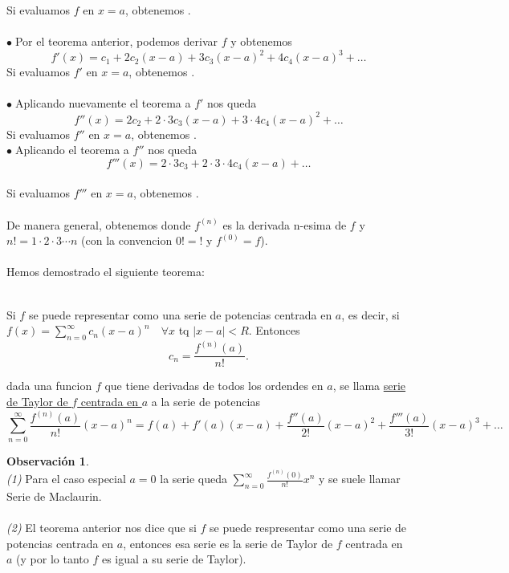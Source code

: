 \documentclass{article}
\theoremstyle{definition}
\newtheorem*{obs}{Observación}
\theoremstyle{remark}
\newcommand\bl{$\bullet\;$}
\begin{document}
 Si evaluamos $f$ en $x=a$, obtenemos .
\\\\
\bl Por el teorema anterior, podemos derivar $f$ y obtenemos \[
f'(x)=c_1+2c_2(x-a)+3c_3(x-a)^2+4c_4(x-a)^3+\dots
\]
 Si evaluamos $f'$ en $x=a$, obtenemos .
\\\\
\bl Aplicando nuevamente el teorema a $f'$ nos queda 
\[ 
f''(x)=2c_2+2\cdot 3 c_3 (x-a)+3\cdot 4 c_4(x-a)^2+\dots
\]
 Si evaluamos $f''$ en $x=a$, obtenemos . \\  

\bl Aplicando el teorema a $f''$ nos queda \[ 
f'''(x)=2\cdot 3 c_3+2\cdot3\cdot4 c_4(x-a)+\dots
\] \\
 Si evaluamos $f'''$ en $x=a$, obtenemos .
\\\\
De manera general, obtenemos  donde $f^{(n)}$ es la derivada n-esima  de $f$ y $n!=1\cdot2\cdot3\cdots n$ \big(con la convencion $0!=!$ y $f^{(0)}=f$\big).
\\\\
Hemos demostrado el siguiente teorema:
\begin{teo} \; \\
Si $f$ se puede representar como una serie de potencias centrada en $a$, es decir, si $f(x)=\sum_{n=0}^{\infty}{c_n(x-a)^n}\quad \forall x$ tq $|x-a|<R$. Entonces \[
  c_n=\frac{f^{(n)}(a)}{n!}.
\] 
\end{teo}
\pagebreak
\begin{defi}
  dada una funcion $f$ que tiene derivadas de todos los ordendes en $a$, se llama \underline{serie de Taylor de $f$ centrada en $a$} a la serie de potencias \[
  \sum_{n=0}^{\infty}{\frac{f^{(n)}(a)}{n!}(x-a)^n}
  =
f(a) + f'(a)(x-a)+\frac{f''(a)}{2!}(x-a)^2+\frac{f'''(a)}{3!}(x-a)^3+\dots
\]
\end{defi}

\begin{obs}\; \\
  \emph{(1)} Para el caso especial $a=0$ la serie queda $\sum_{n=0}^{\infty}{\frac{f^{(n)}(0)}{n!}x^n}$ y se suele llamar Serie de Maclaurin. \\ \\
  \emph{(2)} El teorema anterior nos dice que si $f$ se puede respresentar como una serie de potencias centrada en $a$, entonces esa serie es la serie de Taylor de $f$ centrada en $a$ (y por lo tanto $f$ es igual a su serie de Taylor).
\end{obs}
\end{document}

